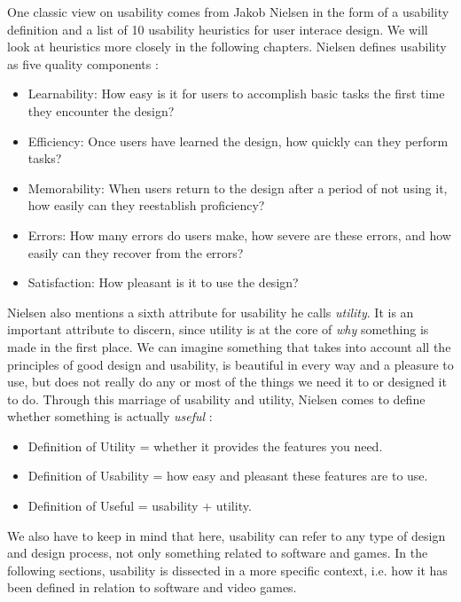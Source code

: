 One classic view on usability comes from Jakob Nielsen in the form of a usability definition and a list of 10 usability heuristics for user interace design. We will look at heuristics more closely in the following chapters. Nielsen defines usability as five quality components \cite{Nielsen2012}:

\begin{itemize}
	\item Learnability: How easy is it for users to accomplish basic tasks the first time they encounter the design?
	\item Efficiency: Once users have learned the design, how quickly can they perform tasks?
	\item Memorability: When users return to the design after a period of not using it, how easily can they reestablish proficiency?
	\item Errors: How many errors do users make, how severe are these errors, and how easily can they recover from the errors?
	\item Satisfaction: How pleasant is it to use the design?
\end{itemize}

Nielsen also mentions a sixth attribute for usability he calls \textit{utility}. It is an important attribute to discern, since utility is at the core of \textit{why} something is made in the first place. We can imagine something that takes into account all the principles of good design and usability, is beautiful in every way and a pleasure to use, but does not really do any or most of the things we need it to or designed it to do. Through this marriage of usability and utility, Nielsen comes to define whether something is actually \textit{useful} \cite{Nielsen2012}: 

\begin{itemize}

	\item Definition of Utility = whether it provides the features you need.
	\item Definition of Usability = how easy and pleasant these features are to use.
	\item Definition of Useful = usability + utility.

\end{itemize}

We also have to keep in mind that here, usability can refer to any type of design and design process, not only something related to software and games. In the following sections, usability is dissected in a more specific context, i.e. how it has been defined in relation to software and video games.

